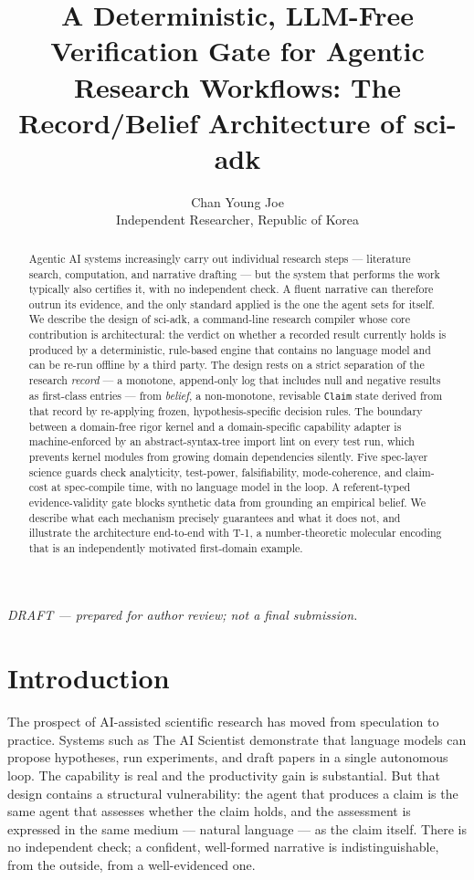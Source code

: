 \documentclass[11pt]{article}
\title{A Deterministic, LLM-Free Verification Gate for Agentic Research Workflows: The Record/Belief Architecture of sci-adk}
\author{Chan Young Joe \\
\small Independent Researcher, Republic of Korea}
\date{}
\begin{document}
\maketitle

\begin{center}
\textit{DRAFT --- prepared for author review; not a final submission.}
\end{center}

\bigskip

\begin{abstract}
Agentic AI systems increasingly carry out individual research steps --- literature search, computation, and narrative drafting --- but the system that performs the work typically also certifies it, with no independent check. A fluent narrative can therefore outrun its evidence, and the only standard applied is the one the agent sets for itself. We describe the design of sci-adk, a command-line research compiler whose core contribution is architectural: the verdict on whether a recorded result currently holds is produced by a deterministic, rule-based engine that contains no language model and can be re-run offline by a third party. The design rests on a strict separation of the research \textit{record} --- a monotone, append-only log that includes null and negative results as first-class entries --- from \textit{belief}, a non-monotone, revisable \texttt{Claim} state derived from that record by re-applying frozen, hypothesis-specific decision rules. The boundary between a domain-free rigor kernel and a domain-specific capability adapter is machine-enforced by an abstract-syntax-tree import lint on every test run, which prevents kernel modules from growing domain dependencies silently. Five spec-layer science guards check analyticity, test-power, falsifiability, mode-coherence, and claim-cost at spec-compile time, with no language model in the loop. A referent-typed evidence-validity gate blocks synthetic data from grounding an empirical belief. We describe what each mechanism precisely guarantees and what it does not, and illustrate the architecture end-to-end with T-1, a number-theoretic molecular encoding that is an independently motivated first-domain example.
\end{abstract}

\section{Introduction}

The prospect of AI-assisted scientific research has moved from speculation to practice. Systems such as The AI Scientist \citep{aiscientist} demonstrate that language models can propose hypotheses, run experiments, and draft papers in a single autonomous loop. The capability is real and the productivity gain is substantial. But that design contains a structural vulnerability: the agent that produces a claim is the same agent that assesses whether the claim holds, and the assessment is expressed in the same medium --- natural language --- as the claim itself. There is no independent check; a confident, well-formed narrative is indistinguishable, from the outside, from a well-evidenced one.
\end{document}
